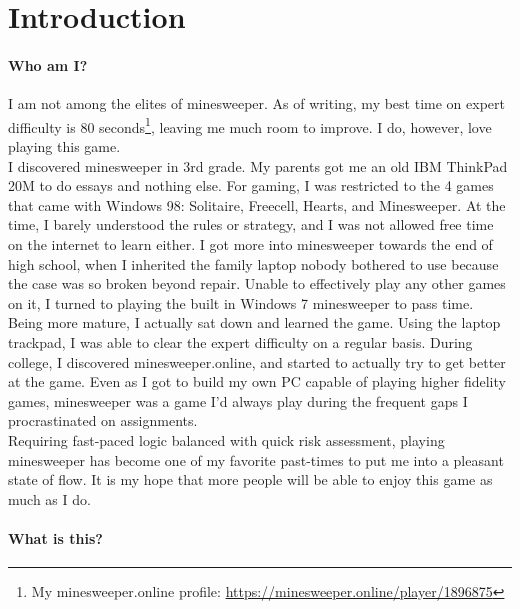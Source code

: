 \chapter{Introduction}

\subsubsection*{Who am I?}

I am not among the elites of minesweeper. As of writing, my best time on expert difficulty is 80 seconds\footnote{My minesweeper.online profile: \url{https://minesweeper.online/player/1896875}}, leaving me much room to improve. I do, however, love playing this game.\\

I discovered minesweeper in 3rd grade. My parents got me an old IBM ThinkPad 20M to do essays and nothing else. For gaming, I was restricted to the 4 games that came with Windows 98: Solitaire, Freecell, Hearts, and Minesweeper. At the time, I barely understood the rules or strategy, and I was not allowed free time on the internet to learn either. I got more into minesweeper towards the end of high school, when I inherited the family laptop nobody bothered to use because the case was so broken beyond repair. Unable to effectively play any other games on it, I turned to playing the built in Windows 7 minesweeper to pass time. Being more mature, I actually sat down and learned the game. Using the laptop trackpad, I was able to clear the expert difficulty on a regular basis. During college, I discovered minesweeper.online, and started to actually try to get better at the game. Even as I got to build my own PC capable of playing higher fidelity games, minesweeper was a game I'd always play during the frequent gaps I procrastinated on assignments.\\

Requiring fast-paced logic balanced with quick risk assessment, playing minesweeper has become one of my favorite past-times to put me into a pleasant state of flow. It is my hope that more people will be able to enjoy this game as much as I do.\\

\subsubsection*{What is this?}

